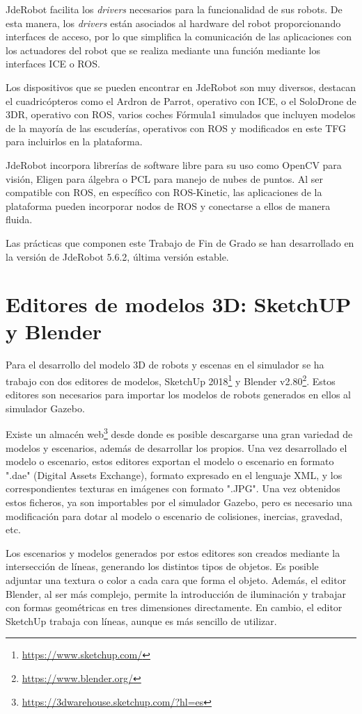 JdeRobot facilita los \textit{drivers} necesarios para la funcionalidad de sus robots. De esta manera, los \textit{drivers} están asociados al hardware del robot proporcionando interfaces de acceso, por lo que simplifica la comunicación de las aplicaciones con los actuadores del robot que se realiza mediante una función mediante los interfaces ICE o ROS.

Los dispositivos que se pueden encontrar en JdeRobot son muy diversos, destacan el cuadricópteros como el Ardron de Parrot, operativo con ICE, o el SoloDrone de 3DR, operativo con ROS, varios coches Fórmula1 simulados que incluyen modelos de la mayoría de las escuderías, operativos con ROS y modificados en este TFG para incluirlos en la plataforma.

JdeRobot incorpora librerías de software libre para su uso como OpenCV para visión, Eligen para álgebra o PCL para manejo de nubes de puntos. Al ser compatible con ROS, en específico con ROS-Kinetic, las aplicaciones de la plataforma pueden incorporar nodos de ROS y conectarse a ellos de manera fluida.

Las prácticas que componen este Trabajo de Fin de Grado se han desarrollado en la versión de JdeRobot 5.6.2, última versión estable.

\section{Editores de modelos 3D: SketchUP y Blender}
Para el desarrollo del modelo 3D de robots y escenas en el simulador se ha trabajo con dos editores de modelos, SketchUp 2018\footnote{\url{https://www.sketchup.com/}} y Blender v2.80\footnote{\url{https://www.blender.org/}}. Estos editores son necesarios para importar los modelos de robots generados en ellos al simulador Gazebo.

Existe un almacén web\footnote{\url{https://3dwarehouse.sketchup.com/?hl=es}} desde donde es posible descargarse una gran variedad de modelos y escenarios, además de desarrollar los propios. Una vez desarrollado el modelo o escenario, estos editores exportan el modelo o escenario en formato ".dae" (Digital Assets Exchange), formato expresado en el lenguaje XML, y los correspondientes texturas en imágenes con formato ".JPG". Una vez obtenidos estos ficheros, ya son importables por el simulador Gazebo, pero es necesario una modificación para dotar al modelo o escenario de colisiones, inercias, gravedad, etc. 

Los escenarios y modelos generados por estos editores son creados mediante la intersección de líneas, generando los distintos tipos de objetos. Es posible adjuntar una textura o color a cada cara que forma el objeto. Además, el editor Blender, al ser más complejo, permite la introducción de iluminación y trabajar con formas geométricas en tres dimensiones directamente. En cambio, el editor SketchUp trabaja con líneas, aunque es más sencillo de utilizar.

